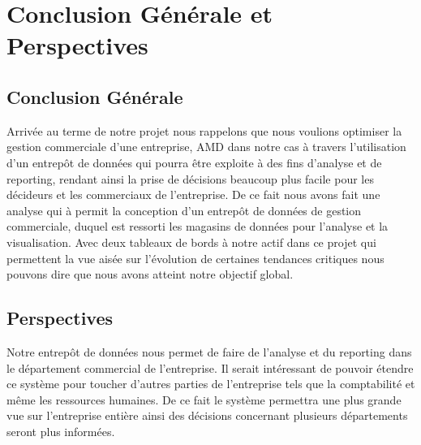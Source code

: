 \chapter*{Conclusion Générale et Perspectives}%
%

\section*{Conclusion Générale}
%

Arrivée au terme de notre projet nous rappelons que nous voulions optimiser la gestion commerciale d’une entreprise, AMD dans notre cas à travers l’utilisation d’un entrepôt de données qui pourra être exploite à des fins d’analyse et de reporting, rendant ainsi la prise de décisions beaucoup plus facile pour les décideurs et les commerciaux de l’entreprise. De ce fait nous avons fait une analyse qui à permit la conception d’un entrepôt de données de gestion commerciale, duquel est ressorti les magasins de données pour l’analyse et la visualisation. Avec deux tableaux de bords à notre actif dans ce projet qui permettent la vue aisée sur l’évolution de certaines tendances critiques nous pouvons dire que nous avons atteint notre objectif global.

\section*{Perspectives}
%

Notre entrepôt de données nous permet de faire de l’analyse et du reporting dans le département commercial de l’entreprise. Il serait intéressant de pouvoir étendre ce système pour toucher d’autres parties de l’entreprise tels que la comptabilité et même les ressources humaines. De ce fait le système permettra une plus grande vue sur l’entreprise entière ainsi des décisions concernant plusieurs départements seront plus informées. 
